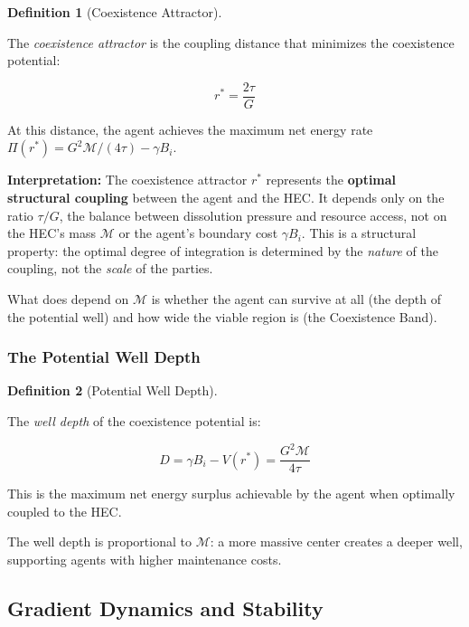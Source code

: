\documentclass[11pt]{article}
\theoremstyle{plain}
\theoremstyle{definition}
\newtheorem{definition}{Definition}
\theoremstyle{remark}
\let\origsubsection\subsection
\renewcommand{\subsection}{\needspace{7\baselineskip}\origsubsection}
\let\origsubsubsection\subsubsection
\renewcommand{\subsubsection}{\needspace{4\baselineskip}\origsubsubsection}
\begin{document}
\begin{definition}[Coexistence Attractor]
\label{def-coexistence-attractor}

The \emph{coexistence attractor} is the coupling distance that minimizes the coexistence potential:

$$r^* = \frac{2\tau}{G}$$

At this distance, the agent achieves the maximum net energy rate $\Pi(r^*) = G^2\mathcal{M}/(4\tau) - \gamma B_i$.
\end{definition}

\textbf{Interpretation:} The coexistence attractor \(r^*\) represents
the \textbf{optimal structural coupling} between the agent and the HEC.
It depends only on the ratio \(\tau/G\), the balance between dissolution
pressure and resource access, not on the HEC's mass \(\mathcal{M}\) or
the agent's boundary cost \(\gamma B_i\). This is a structural property:
the optimal degree of integration is determined by the \emph{nature} of
the coupling, not the \emph{scale} of the parties.

What does depend on \(\mathcal{M}\) is whether the agent can survive at
all (the depth of the potential well) and how wide the viable region is
(the Coexistence Band).

\subsubsection{The Potential Well Depth}\label{the-potential-well-depth}

\begin{definition}[Potential Well Depth]
\label{def-potential-well-depth}

The \emph{well depth} of the coexistence potential is:

$$D = \gamma B_i - V(r^*) = \frac{G^2 \mathcal{M}}{4\tau}$$

This is the maximum net energy surplus achievable by the agent when optimally coupled to the HEC.
\end{definition}

The well depth is proportional to \(\mathcal{M}\): a more massive center
creates a deeper well, supporting agents with higher maintenance costs.

\subsection{Gradient Dynamics and
Stability}\label{gradient-dynamics-and-stability}
\end{document}
